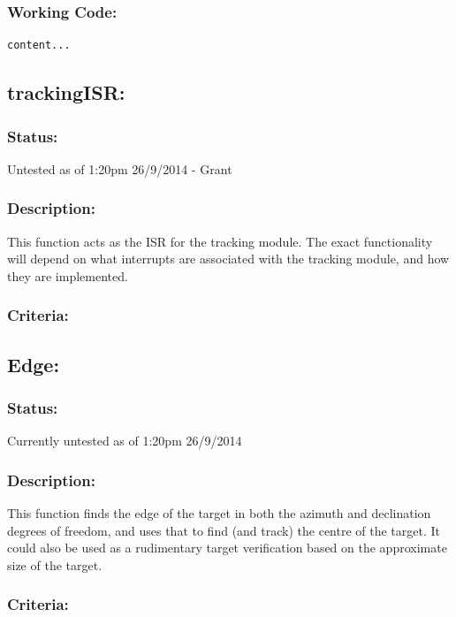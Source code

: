 \documentclass[]{report}
\begin{document}
\subsubsection{Working Code:}
\begin{lstlisting}
content...
\end{lstlisting}

\subsection{trackingISR:}
\subsubsection{Status:}
Untested as of 1:20pm 26/9/2014 - Grant

\subsubsection{Description:}
This function acts as the ISR for the tracking module. The exact functionality will depend on what interrupts are associated with the tracking module, and how they are implemented.

\subsubsection{Criteria:}


\subsection{Edge:}
\subsubsection{Status:}
Currently untested as of 1:20pm 26/9/2014

\subsubsection{Description:}
This function finds the edge of the target in both the azimuth and declination degrees of freedom, and uses that to find (and track) the centre of the target. It could also be used as a rudimentary target verification based on the approximate size of the target.

\subsubsection{Criteria:}
\end{document}
